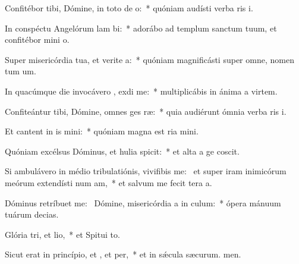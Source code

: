 \item Confitébor tibi, Dómine, in toto de o:~* quóniam audísti verba ris i.
\item In conspéctu Angelórum lam bi:~* adorábo ad templum sanctum tuum, et confitébor mini o.
\item Super misericórdia tua, et verite a:~* quóniam magnificásti super omne, nomen tum um.
\item In quacúmque die invocávero , exdi me:~* multiplicábis in ánima a virtem.
\item Confiteántur tibi, Dómine, omnes ges ræ:~* quia audiérunt ómnia verba ris i.
\item Et cantent in is mini:~* quóniam magna est ria mini.
\item Quóniam excélsus Dóminus, et hulia spicit:~* et alta a ge coscit.
\item Si ambulávero in médio tribulatiónis, vivifibis me:~\pscross{} et super iram inimicórum meórum extendísti num am,~* et salvum me fecit tera a.
\item Dóminus retríbuet  me:~\pscross{} Dómine, misericórdia a in culum:~* ópera mánuum tuárum  decias.
\item Glória tri, et lio,~* et Spitui to.
\item Sicut erat in princípio, et , et per,~* et in sǽcula sæcurum. men.

